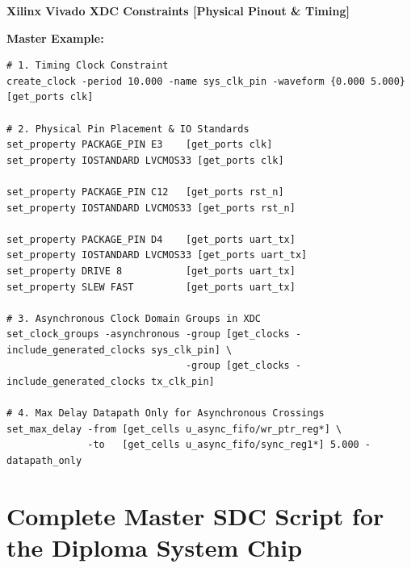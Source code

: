 \documentclass[11pt,a4paper]{article}
\newenvironment{cmdbox}[2]{%
  \begin{mdframed}[style=cmdstyle]%
  {\bfseries\sffamily\color{primary}#1 \hfill \footnotesize\color{mutedgray}[#2]}\par\vspace{3pt}%
}{%
  \end{mdframed}%
}
\begin{document}
\begin{cmdbox}{Xilinx Vivado XDC Constraints}{Physical Pinout \& Timing}
\textbf{Master Example:}
\begin{lstlisting}[style=xdcstyle]
# 1. Timing Clock Constraint
create_clock -period 10.000 -name sys_clk_pin -waveform {0.000 5.000} [get_ports clk]

# 2. Physical Pin Placement & IO Standards
set_property PACKAGE_PIN E3    [get_ports clk]
set_property IOSTANDARD LVCMOS33 [get_ports clk]

set_property PACKAGE_PIN C12   [get_ports rst_n]
set_property IOSTANDARD LVCMOS33 [get_ports rst_n]

set_property PACKAGE_PIN D4    [get_ports uart_tx]
set_property IOSTANDARD LVCMOS33 [get_ports uart_tx]
set_property DRIVE 8           [get_ports uart_tx]
set_property SLEW FAST         [get_ports uart_tx]

# 3. Asynchronous Clock Domain Groups in XDC
set_clock_groups -asynchronous -group [get_clocks -include_generated_clocks sys_clk_pin] \
                               -group [get_clocks -include_generated_clocks tx_clk_pin]

# 4. Max Delay Datapath Only for Asynchronous Crossings
set_max_delay -from [get_cells u_async_fifo/wr_ptr_reg*] \
              -to   [get_cells u_async_fifo/sync_reg1*] 5.000 -datapath_only
\end{lstlisting}
\end{cmdbox}

\section{Complete Master SDC Script for the Diploma System Chip}
\end{document}
